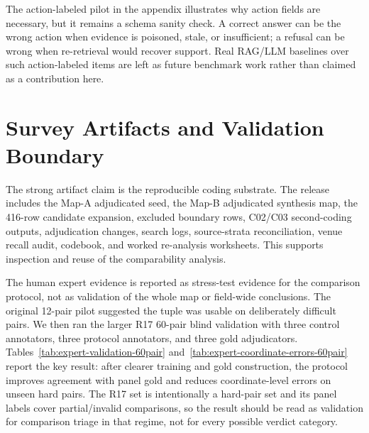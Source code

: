 \documentclass[11pt]{article}
\begin{document}


The action-labeled pilot in the appendix illustrates why action fields are necessary, but it remains a schema sanity check. A correct answer can be the wrong action when evidence is poisoned, stale, or insufficient; a refusal can be wrong when re-retrieval would recover support. Real RAG/LLM baselines over such action-labeled items are left as future benchmark work rather than claimed as a contribution here.

\section{Survey Artifacts and Validation Boundary}
\label{sec:audit-validation}

The strong artifact claim is the reproducible coding substrate. The release includes the Map-A adjudicated seed, the Map-B adjudicated synthesis map, the 416-row candidate expansion, excluded boundary rows, C02/C03 second-coding outputs, adjudication changes, search logs, source-strata reconciliation, venue recall audit, codebook, and worked re-analysis worksheets. This supports inspection and reuse of the comparability analysis.

The human expert evidence is reported as stress-test evidence for the comparison protocol, not as validation of the whole map or field-wide conclusions. The original 12-pair pilot suggested the tuple was usable on deliberately difficult pairs. We then ran the larger R17 60-pair blind validation with three control annotators, three protocol annotators, and three gold adjudicators. Tables~\ref{tab:expert-validation-60pair} and~\ref{tab:expert-coordinate-errors-60pair} report the key result: after clearer training and gold construction, the protocol improves agreement with panel gold and reduces coordinate-level errors on unseen hard pairs. The R17 set is intentionally a hard-pair set and its panel labels cover partial/invalid comparisons, so the result should be read as validation for comparison triage in that regime, not for every possible verdict category.
\end{document}

